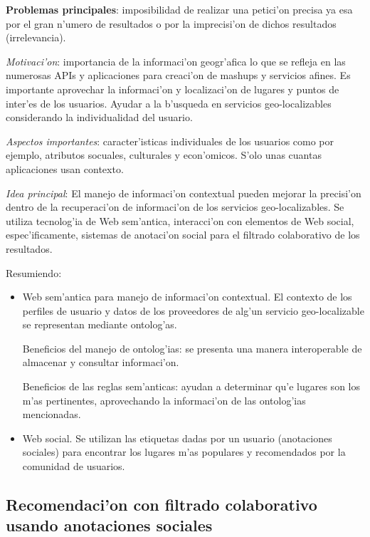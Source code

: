 \documentclass[11pt]{article}
\begin{document}
\textbf{Problemas principales}: imposibilidad de realizar una petici'on precisa ya esa por el gran n'umero de resultados o por la imprecisi'on de dichos resultados (irrelevancia).

\textit{Motivaci'on}: importancia de la informaci'on geogr'afica lo que se refleja en las numerosas APIs y aplicaciones para creaci'on de mashups y servicios afines. Es importante aprovechar la informaci'on y localizaci'on de lugares y puntos de inter'es de los usuarios. Ayudar a la b'usqueda en servicios geo-localizables considerando la individualidad del usuario.

\textit{Aspectos importantes}: caracter'isticas individuales de los usuarios como por ejemplo, atributos socuales, culturales y econ'omicos. S'olo unas cuantas aplicaciones usan contexto. 

\textit{Idea principal}: El manejo de informaci'on contextual pueden mejorar la precisi'on dentro de la recuperaci'on de informaci'on de los servicios geo-localizables. Se utiliza tecnolog'ia de Web sem'antica, interacci'on con elementos de Web social, espec'ificamente, sistemas de anotaci'on social para el filtrado colaborativo de los resultados.

Resumiendo:
\begin{itemize}
\item Web sem'antica para manejo de informaci'on contextual. El contexto de los perfiles de usuario y datos de los proveedores de alg'un servicio geo-localizable se representan mediante ontolog'as. 

Beneficios del manejo de ontolog'ias: se presenta una manera interoperable de almacenar y consultar informaci'on.

Beneficios de las reglas sem'anticas: ayudan a determinar qu'e lugares son los m'as pertinentes, aprovechando la informaci'on de las ontolog'ias mencionadas.

\item Web social. Se utilizan las etiquetas dadas por un usuario (anotaciones sociales) para encontrar los lugares m'as populares y recomendados por la comunidad de usuarios.
\end{itemize}

\subsection{Recomendaci'on con filtrado colaborativo usando anotaciones sociales}
\end{document}
